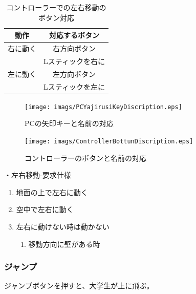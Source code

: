 \documentclass[12pt]{jsarticle}
\begin{document}
\begin{table}[htbp]
  \centering
  \caption{コントローラーでの左右移動のボタン対応}
  \begin{tabular}{c|c}
    動作 & 対応するボタン\\
    \hline
    右に動く & 右方向ボタン \\
      & Lスティックを右に \\
    \hline
    左に動く & 左方向ボタン \\
      & Lスティックを左に
  \end{tabular}
\end{table}

\newpage

\begin{figure}[htbp]
  \begin{center}
    \texttt{[image: imags/PCYajirusiKeyDiscription.eps]}
    \caption{PCの矢印キーと名前の対応}
  \end{center}
  \begin{center}
    \texttt{[image: imags/ControllerBottunDiscription.eps]}
    \caption{コントローラーのボタンと名前の対応}
  \end{center}
\end{figure}

\newpage

・左右移動-要求仕様
\begin{enumerate}
  \item 地面の上で左右に動く
  \item 空中で左右に動く
  \item 左右に動けない時は動かない
  \begin{enumerate}
    \item 移動方向に壁がある時
  \end{enumerate}
\end{enumerate}

\newpage

\subsubsection{ジャンプ}

ジャンプボタンを押すと、大学生が上に飛ぶ。
\end{document}
